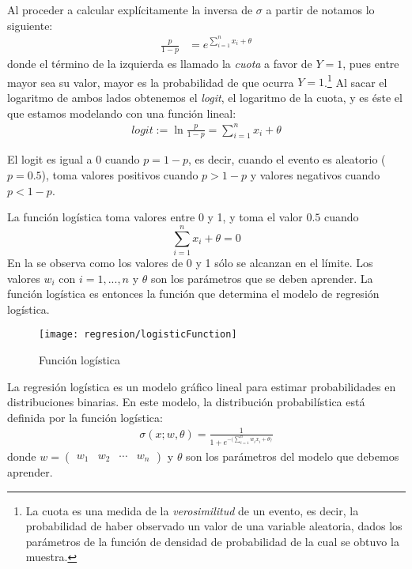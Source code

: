 Al proceder a calcular explícitamente la inversa de $\sigma$ a partir de  notamos lo siguiente:
\begin{align*}
 \frac{p}{1-p} &= e^{\sum_{i=1}^n x_i + \theta}
\end{align*}
donde el término de la izquierda es llamado la \emph{cuota} a favor de $Y=1$, pues entre mayor sea su valor, mayor es la probabilidad de que ocurra $Y=1$.\footnote{La cuota es una medida de la \emph{verosimilitud} de un evento, es decir, la probabilidad de haber observado un valor de una variable aleatoria, dados los parámetros de la función de densidad de probabilidad de la cual se obtuvo la muestra. }  Al sacar el logaritmo de ambos lados obtenemos el \emph{logit}, el logaritmo de la cuota, y es éste el que estamos modelando con una función lineal:
\begin{align*}
logit := \ln \frac{p}{1-p} = \sum_{i=1}^n x_i + \theta
\end{align*}

El logit es igual a 0 cuando $ p = 1-p$, es decir, cuando el evento es aleatorio ($p = 0.5$), toma valores positivos cuando $p > 1-p$ y valores negativos cuando $p < 1-p$.

La función logística toma valores entre 0 y 1, y toma el valor $0.5$ cuando $$\sum_{i=1}^n x_i + \theta = 0$$ En la  se observa como los valores de 0 y 1 sólo se alcanzan en el límite. Los valores $w_i$ con $i=1,...,n$ y $\theta$ son los parámetros que se deben aprender. La función logística es entonces la función que determina el modelo de regresión logística.


\begin{figure}
 \centering
 \texttt{[image: regresion/logisticFunction]}
 \caption{Función logística}\label{Fig:Logistic}
\end{figure}




\begin{definition}
La regresión logística es un modelo gráfico lineal para estimar probabilidades en distribuciones binarias. En este modelo, la distribución probabilística está definida por la función logística:
\begin{align*}
 \sigma(x; w, \theta) = \frac{1}{1 + e^{-\big(\sum_{i=1}^n w_i x_i + \theta\big)}}
\end{align*}
donde $w = \begin{pmatrix} w_1 & w_2 & \cdots & w_n \end{pmatrix}$ y $\theta$ son los parámetros del modelo que debemos aprender.
\end{definition}

